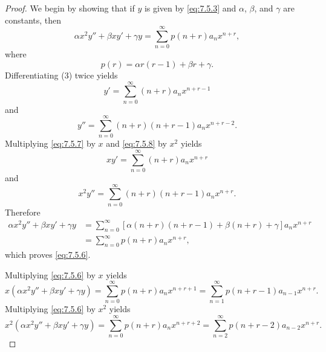 \begin{proof}
We begin by showing that if $y$ is given by \eqref{eq:7.5.3} and
$\alpha$, $\beta$, and $\gamma$ are constants, then
\begin{equation} \label{eq:7.5.6}
\alpha x^2y''+\beta xy'+\gamma y=
\sum_{n=0}^\infty p(n+r)a_nx^{n+r},
\end{equation}
where
\[
p(r)=\alpha r(r-1)+\beta r +\gamma.
\]
Differentiating (3)  twice yields
\begin{equation} \label{eq:7.5.7}
y'=\sum_{n=0}^\infty (n+r)a_nx^{n+r-1}
\end{equation}
and
\begin{equation} \label{eq:7.5.8}
y''=\sum_{n=0}^\infty (n+r)(n+r-1)a_nx^{n+r-2}.
\end{equation}
Multiplying \eqref{eq:7.5.7} by $x$ and \eqref{eq:7.5.8} by $x^2$ yields
\[
xy'=\sum_{n=0}^\infty (n+r)a_nx^{n+r}
\]
and
\[
x^2y''=\sum_{n=0}^\infty (n+r)(n+r-1)a_nx^{n+r}.
\]
Therefore
\begin{align*}
\alpha x^2y''+\beta xy'+\gamma y
&=\sum_{n=0}^\infty\left[\alpha(n+r)(n+r-1)+\beta(n+r)+\gamma\right]a_n
x^{n+r}\\
&=\sum_{n=0}^\infty p(n+r)a_nx^{n+r},
\end{align*}
which proves  \eqref{eq:7.5.6}.

 Multiplying \eqref{eq:7.5.6} by $x$ yields
\begin{equation} \label{eq:7.5.9}
x(\alpha x^2y''+\beta xy'+\gamma
y)=\sum_{n=0}^\infty p(n+r) a_nx^{n+r+1}=
\sum_{n=1}^\infty p(n+r-1)a_{n-1}x^{n+r}.
\end{equation}
Multiplying \eqref{eq:7.5.6} by $x^2$ yields
\begin{equation} \label{eq:7.5.10}
x^2(\alpha x^2y''+\beta xy'+\gamma
y)=\sum_{n=0}^\infty p(n+r)a_nx^{n+r+2}=
\sum_{n=2}^\infty p(n+r-2)a_{n-2}x^{n+r}.
\end{equation}


\end{proof}
